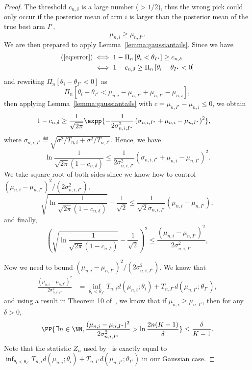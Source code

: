 \begin{proof}
The threshold $c_{n,\delta}$ is a large number ($>1/2$), thus the wrong pick could only occur if the posterior mean of arm $i$ is larger than the posterior mean of the true best arm $I^\star$,
\[
    \mu_{n,i} \geq \mu_{n,I^\star}.
\]
We are then prepared to apply Lemma~\ref{lemma:gaussiantails}. Since we have
\begin{align*}
    (\ref{eq:error}) &\iff 1 - \Pi_{n}\left[\theta_i < \theta_{I^\star} \right] \geq c_{n,\delta} \\
                     &\iff 1 - c_{n,\delta} \geq \Pi_{n}\left[\theta_i - \theta_{I^\star} < 0 \right] \\
\end{align*}
and rewriting $\Pi_{n}\left[\theta_i - \theta_{I^\star} < 0 \right]$ as 
\[
\Pi_{n}\left[\theta_i - \theta_{I^\star} < \mu_{n,i} - \mu_{n,I^\star} + \mu_{n,I^\star} - \mu_{n,i} \right],
\]
then applying Lemma~\ref{lemma:gaussiantails} with $c = \mu_{n,I^\star} - \mu_{n,i} \leq 0$, we obtain
\begin{align*}
    1 - c_{n,\delta} &\geq \frac{1}{\sqrt{2\pi}} \expp{-\frac{1}{2\sigma_{n,i,I^\star}^2}\left( \sigma_{n,i,I^\star}+\mu_{n,i}-\mu_{n,I^\star} \right)^2},
\end{align*}
where $\sigma_{n,i,I^\star} \eqdef \sqrt{\sigma^2/T_{n,i}+\sigma^2/T_{n,I^\star}}$. Hence, we have
\[
    \ln{\frac{1}{\sqrt{2\pi}(1-c_{n,\delta})}} \leq \frac{1}{2\sigma_{n,i,I^\star}^2}\left( \sigma_{n,i,I^\star}+\mu_{n,i}-\mu_{n,I^\star} \right)^2.
\]
We take square root of both sides since we know how to control $(\mu_{n,i}-\mu_{n,I^\star})^2/(2\sigma_{n,i,I^\star}^2)$, 
\[
    \sqrt{\ln{\frac{1}{\sqrt{2\pi}(1-c_{n,\delta})}}} - \frac{1}{\sqrt{2}} \leq \frac{1}{\sqrt{2}\sigma_{n,i,I^\star}} (\mu_{n,i}-\mu_{n,I^\star}),
\]
and finally,
\[
    \left( \sqrt{\ln{\frac{1}{\sqrt{2\pi}(1-c_{n,\delta})}}} - \frac{1}{\sqrt{2}} \right)^2 \leq \frac{(\mu_{n,i}-\mu_{n,I^\star})^2}{2\sigma_{n,i,I^\star}^2},
\]

Now we need to bound $(\mu_{n,i}-\mu_{n,I^\star})^2/(2\sigma_{n,i,I^\star}^2)$. We know that
\begin{align*}
    \frac{(\mu_{n,i}-\mu_{n,I^\star})^2}{2\sigma_{n,i,I^\star}^2} &= \inf_{\theta_i<\theta_{I^\star}} T_{n,i}d(\mu_{n,i};\theta_i) + T_{n,I^\star}d(\mu_{n,I^\star};\theta_{I^\star}),
\end{align*}
and using a result in Theorem 10 of~\citet{garivier2016tracknstop}, we know that if $\mu_{n,i} \geq \mu_{n,I^\star}$, then for any $\delta>0$,
\[
    \PP{\exists n\in\NN, \frac{(\mu_{n,i}-\mu_{n,I^\star})^2}{2\sigma_{n,i,I^\star}^2} > \ln{\frac{2n(K-1)}{\delta}}} \leq \frac{\delta}{K-1}.
\]
Note that the statistic $Z_n$ used by~\citet{garivier2016tracknstop} is exactly equal to $\inf_{\theta_i<\theta_{I^\star}} T_{n,i}d(\mu_{n,i};\theta_i) + T_{n,I^\star}d(\mu_{n,I^\star};\theta_{I^\star})$ in our Gaussian case.


\end{proof}
